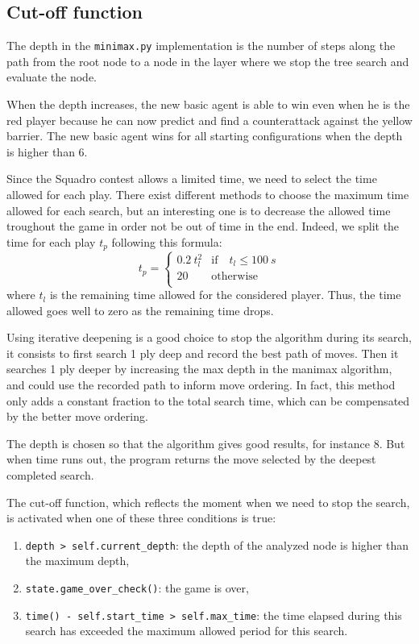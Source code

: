 \documentclass[en]{article}
\newcommand{\py}[1]{\texttt{#1}}
\begin{document}
\subsection{Cut-off function}

The depth in the \py{minimax.py} implementation is the number of steps along the path from the root node to a node in the layer where we stop the tree search and evaluate the node.

When the depth increases, the new basic agent is able to win even when he is the red player because he can now predict and find a counterattack against the yellow barrier. The new basic agent wins for all starting configurations when the depth is higher than 6.

Since the Squadro contest allows a limited time, we need to select the time allowed for each play.
There exist different methods to choose the maximum time allowed for each search, but an interesting one is to decrease the allowed time troughout the game in order not be out of time in the end. Indeed, we split the time for each play $t_{p}$ following this formula:
\[
    t_{p} = 
    \left\{
    \begin{array}{ll}
      0.2 \: t_{l}^2 & \mathrm{if}\quad t_{l}\leq \SI{100}{s} \\
      20 & \mathrm{otherwise} \\
    \end{array} 
    \right.
\]
where $t_l$ is the remaining time allowed for the considered player. Thus, the time allowed goes well to zero as the remaining time drops.

Using iterative deepening is a good choice to stop the algorithm during its search, it consists to first search 1 ply deep and record the best path of moves. Then it searches 1 ply deeper by increasing the max depth in the manimax algorithm, and could use the recorded path to inform move ordering. In fact, this method only adds a constant fraction to the total search time, which can be compensated by the better move ordering.

The depth is chosen so that the algorithm gives good results, for instance 8. But when time runs out, the program returns the move selected by the deepest completed search.

The cut-off function, which reflects the moment when we need to stop the search, is activated when one of these three conditions is true:

\begin{enumerate}
 \item \py{depth > self.current_depth}: the depth of the analyzed node is higher than the maximum depth,
 \item \py{state.game_over_check()}: the game is over,
 \item \py{time() - self.start_time > self.max_time}: the time elapsed during this search has exceeded the maximum allowed period for this search.
\end{enumerate}




\end{document}
